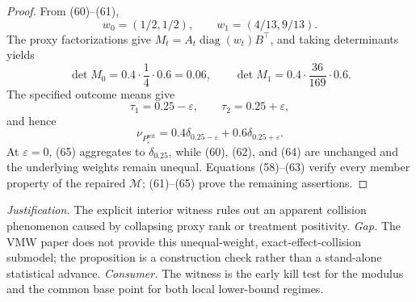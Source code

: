 \documentclass{article}
\begin{document}
\begin{proof}
From (60)--(61),
\[
w_0=(1/2,1/2),\qquad w_1=(4/13,9/13).
\]
The proxy factorizations give \(M_t=A_t\operatorname{diag}(w_t)B^\top\), and taking determinants yields
\[
\det M_0=0.4\cdot\frac14\cdot0.6=0.06,
\qquad
\det M_1=0.4\cdot\frac{36}{169}\cdot0.6.                                   \tag{64}
\]
The specified outcome means give
\[
\tau_1=0.25-\varepsilon,\qquad \tau_2=0.25+\varepsilon,
\]
and hence
\[
\nu_{P_\varepsilon^{\mathrm{wit}}}
=0.4\delta_{0.25-\varepsilon}+0.6\delta_{0.25+\varepsilon}.                  \tag{65}
\]
At \(\varepsilon=0\), (65) aggregates to \(\delta_{0.25}\), while (60), (62), and (64) are unchanged and the underlying weights remain unequal.  Equations (58)--(63) verify every member property of the repaired \(\mathcal M\); (61)--(65) prove the remaining assertions.
\end{proof}
\par\smallskip\noindent \textit{Justification.} The explicit interior witness rules out an apparent collision phenomenon caused by collapsing proxy rank or treatment positivity. \textit{Gap.} The VMW paper does not provide this unequal-weight, exact-effect-collision submodel; the proposition is a construction check rather than a stand-alone statistical advance. \textit{Consumer.} The witness is the early kill test for the modulus and the common base point for both local lower-bound regimes.
\end{document}
